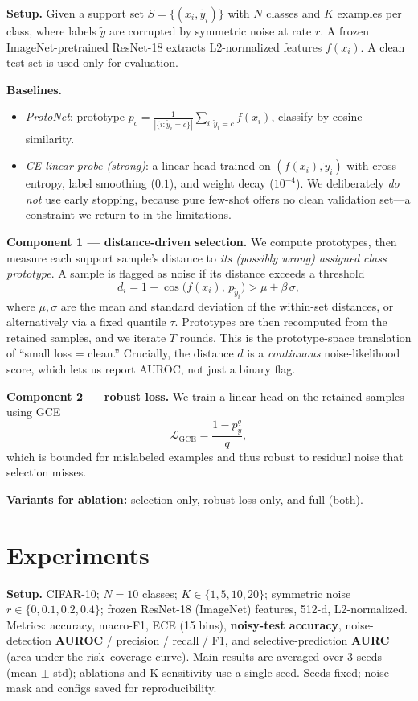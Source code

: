 \documentclass{article}
\begin{document}
\textbf{Setup.} Given a support set $S = \{(x_i, \tilde{y}_i)\}$ with $N$ classes and $K$
examples per class, where labels $\tilde{y}$ are corrupted by symmetric noise at rate $r$. A
frozen ImageNet-pretrained ResNet-18 extracts L2-normalized features $f(x_i)$. A clean test
set is used only for evaluation.

\textbf{Baselines.}
\begin{itemize}
  \item \emph{ProtoNet}: prototype $p_c = \frac{1}{|\{i:\tilde{y}_i=c\}|}\sum_{i:\tilde{y}_i=c} f(x_i)$,
        classify by cosine similarity.
  \item \emph{CE linear probe (strong)}: a linear head trained on $(f(x_i), \tilde{y}_i)$
        with cross-entropy, label smoothing ($0.1$), and weight decay ($10^{-4}$). We
        deliberately \emph{do not} use early stopping, because pure few-shot offers no clean
        validation set---a constraint we return to in the limitations.
\end{itemize}

\textbf{Component 1 --- distance-driven selection.} We compute prototypes, then measure each
support sample's distance to \emph{its (possibly wrong) assigned class prototype}. A sample
is flagged as noise if its distance exceeds a threshold
\[
  d_i = 1 - \cos\bigl(f(x_i),\, p_{\tilde{y}_i}\bigr) > \mu + \beta\,\sigma,
\]
where $\mu,\sigma$ are the mean and standard deviation of the within-set distances, or
alternatively via a fixed quantile $\tau$. Prototypes are then recomputed from the retained
samples, and we iterate $T$ rounds. This is the prototype-space translation of ``small loss
= clean.'' Crucially, the distance $d$ is a \emph{continuous} noise-likelihood score, which
lets us report AUROC, not just a binary flag.

\textbf{Component 2 --- robust loss.} We train a linear head on the retained samples using
GCE
\[
  \mathcal{L}_{\mathrm{GCE}} = \frac{1 - p_{y}^{q}}{q},
\]
which is bounded for mislabeled examples and thus robust to residual noise that selection
misses.

\textbf{Variants for ablation:} selection-only, robust-loss-only, and full (both).

\section{Experiments}
\label{sec:experiments}

\textbf{Setup.} CIFAR-10; $N=10$ classes; $K \in \{1,5,10,20\}$; symmetric noise
$r \in \{0, 0.1, 0.2, 0.4\}$; frozen ResNet-18 (ImageNet) features, 512-d, L2-normalized.
Metrics: accuracy, macro-F1, ECE (15 bins), \textbf{noisy-test accuracy}, noise-detection
\textbf{AUROC} / precision / recall / F1, and selective-prediction \textbf{AURC} (area under
the risk--coverage curve). Main results are averaged over 3 seeds (mean $\pm$ std); ablations
and K-sensitivity use a single seed. Seeds fixed; noise mask and configs saved for
reproducibility.
\end{document}
